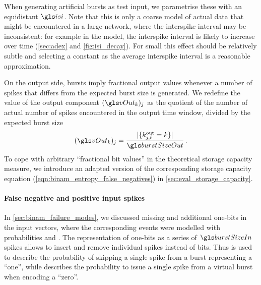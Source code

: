 When generating artificial bursts as test input, we parametrise these with an equidistant \ISI \(\isi\). Note that this is only a coarse model of actual data that might be encountered in a large network, where the interspike interval may be inconsistent: for example in the \AdEx model, the interspike interval is likely to increase over time (\cref{sec:adex} and \cref{fig:isi_decay}). For small \burstSizeIn this effect should be relatively subtle and selecting a constant \isi as the average interspike interval is a reasonable approximation.

On the output side, bursts imply fractional output values whenever a number of spikes that differs from the expected burst size \burstSizeOut is generated. We redefine the value of the output component \((\vOut_k)_j\) as the quotient of the number of actual number of spikes encountered in the output time window, divided by the expected burst size \burstSizeOut
\begin{align}
	(\vOut_k)_j = \frac{| \{k^{\mathrm{out}}_{j, \ell} = k\} |}{\burstSizeOut}
	\label{eqn:spiking_output_values} \,.
\end{align}
To cope with arbitrary \enquote{fractional bit values} in the theoretical \BiNAM storage capacity measure, we introduce an adapted version of the corresponding storage capacity equation (\ref{eqn:binam_entropy_false_negatives}) in \cref{sec:eval_storage_capacity}.

\paragraph{False negative and positive input spikes}
In \cref{sec:binam_failure_modes}, we discussed missing and additional one-bits in the input vectors, where the corresponding events were modelled with probabilities \pFn and \pFp. The representation of one-bits as a series of $\burstSizeIn$ spikes allows to insert and remove individual spikes instead of bits. Thus \pFn is used to describe the probability of skipping a single spike from a burst representing a \enquote{one}, while \pFp describes the probability to issue a single spike from a virtual burst when encoding a \enquote{zero}.

